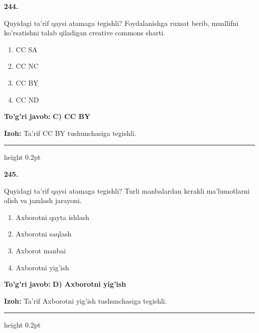 \documentclass[10pt,a4paper,oneside]{article}
\begin{document}
\noindent\textbf{\color{ink}244.}
\par
Quyidagi ta'rif qaysi atamaga tegishli? Foydalanishga ruxsat berib, muallifni ko'rsatishni talab qiladigan creative commons sharti.
\begin{enumerate}[label=\Alph*),leftmargin=9mm]
\item CC SA
\item CC NC
\item CC BY
\item CC ND
\end{enumerate}
\begin{tcolorbox}[enhanced,breakable,colback=teal!4,colframe=teal!50!black,boxrule=0.5pt,arc=1.1mm,left=3mm,right=3mm,top=1.7mm,bottom=1.7mm,before skip=2mm,after skip=2mm]
\textbf{\color{teal}To'g'ri javob:} \textbf{C) CC BY}
\par\smallskip
\textbf{Izoh:} Ta'rif CC BY tushunchasiga tegishli.
\end{tcolorbox}
\vspace{2mm}\hrule height 0.2pt \vspace{3mm}

\noindent\textbf{\color{ink}245.}
\par
Quyidagi ta'rif qaysi atamaga tegishli? Turli manbalardan kerakli ma'lumotlarni olish va jamlash jarayoni.
\begin{enumerate}[label=\Alph*),leftmargin=9mm]
\item Axborotni qayta ishlash
\item Axborotni saqlash
\item Axborot manbai
\item Axborotni yig'ish
\end{enumerate}
\begin{tcolorbox}[enhanced,breakable,colback=teal!4,colframe=teal!50!black,boxrule=0.5pt,arc=1.1mm,left=3mm,right=3mm,top=1.7mm,bottom=1.7mm,before skip=2mm,after skip=2mm]
\textbf{\color{teal}To'g'ri javob:} \textbf{D) Axborotni yig'ish}
\par\smallskip
\textbf{Izoh:} Ta'rif Axborotni yig'ish tushunchasiga tegishli.
\end{tcolorbox}
\vspace{2mm}\hrule height 0.2pt \vspace{3mm}
\end{document}
